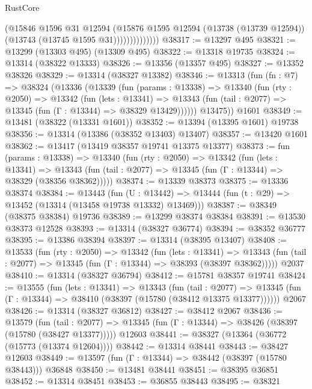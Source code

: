 \begin{lexlean}{RustCore}
\begin{coremodule}
                        (@15846
                          @1596
                          @31
                          @12594
                          (@15876
                            @1595
                            @12594
                            (@13738 (@13739 @12594))
                            (@13743 (@13745 @1595 @31))))))))))))))
@38317 := @13297 @495
@38321 := @13299 (@13303 @495) (@13309 @495)
@38322 := @13318 @19735
@38324 := @13314 (@38322 @13333)
@38326 := @13356 (@13357 @495)
@38327 := @13352 @38326
@38329 := @13314 (@38327 @13382)
@38346 := @13313
    (fun (fn : @7) =>
    @38324
      (@13336
        (@13339
          (fun (params : @13338) =>
          @13340
            (fun (rty : @2050) =>
            @13342
              (fun (lets : @13341) =>
              @13343 (fun (tail : @2077) => @13345 (fun (Γ : @13344) => @38329 @13429))))))
        @13475))
    @1601
@38349 := @13481 (@38322 (@13331 @1601))
@38352 := @13394 (@13395 @1601) @19738
@38356 := @13314 (@13386 (@38352 @13403) @13407)
@38357 := @13420 @1601
@38362 := @13417 (@13419 @38357 @19741 @13375 @13377)
@38373 := fun (params : @13338) =>
  @13340
    (fun (rty : @2050) =>
    @13342
      (fun (lets : @13341) =>
      @13343 (fun (tail : @2077) => @13345 (fun (Γ : @13344) => @38329 (@38356 @38362)))))
@38374 := @13339 @38373
@38375 := @13336 @38374
@38384 := @13443
    (fun (U : @13442) => @13444 (fun (t : @29) => @13452 (@13314 (@13458 @19738 @13332) @13469)))
@38387 := @38349 (@38375 @38384) @19736
@38389 := @13299 @38374 @38384
@38391 := @13530 @38373 @12528
@38393 := @13314 (@38327 @36774)
@38394 := @38352 @36777
@38395 := @13386 @38394
@38397 := @13314 (@38395 @13407)
@38408 := @13533
    (fun (rty : @2050) =>
    @13342
      (fun (lets : @13341) =>
      @13343 (fun (tail : @2077) => @13345 (fun (Γ : @13344) => @38393 (@38397 @38362)))))
    @2037
@38410 := @13314 (@38327 @36794)
@38412 := @15781 @38357 @19741
@38424 := @13555
    (fun (lets : @13341) =>
    @13343
      (fun (tail : @2077) =>
      @13345 (fun (Γ : @13344) => @38410 (@38397 (@15780 (@38412 @13375 @13377))))))
    @2067
@38426 := @13314 (@38327 @36812)
@38427 := @38412 @2067
@38436 := @13579
    (fun (tail : @2077) => @13345 (fun (Γ : @13344) => @38426 (@38397 (@15780 (@38427 @13377)))))
    @12603
@38441 := @38327 (@13364 (@36772 (@15773 (@13374 @12604))))
@38442 := @13314 @38441
@38443 := @38427 @12603
@38449 := @13597 (fun (Γ : @13344) => @38442 (@38397 (@15780 @38443))) @36848
@38450 := @13481 @38441
@38451 := @38395 @36851
@38452 := @13314 @38451
@38453 := @36855 @38443
@38495 := @38321

\end{coremodule}
\end{lexlean}
